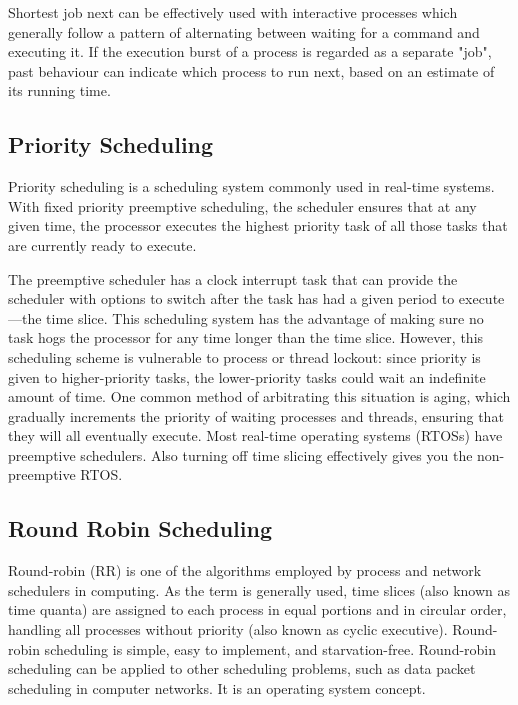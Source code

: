 \documentclass[11pt,a4paper]{report}
\begin{document}
Shortest job next can be effectively used with interactive processes which generally follow a pattern of alternating between waiting for a command and executing it. If the execution burst of a process is regarded as a separate "job", past behaviour can indicate which process to run next, based on an estimate of its running time.

\subsection*{Priority Scheduling}
\hspace*{\parindent}Priority scheduling is a scheduling system commonly used in real-time systems. With fixed priority preemptive scheduling, the scheduler ensures that at any given time, the processor executes the highest priority task of all those tasks that are currently ready to execute.

The preemptive scheduler has a clock interrupt task that can provide the scheduler with options to switch after the task has had a given period to execute—the time slice. This scheduling system has the advantage of making sure no task hogs the processor for any time longer than the time slice. However, this scheduling scheme is vulnerable to process or thread lockout: since priority is given to higher-priority tasks, the lower-priority tasks could wait an indefinite amount of time. One common method of arbitrating this situation is aging, which gradually increments the priority of waiting processes and threads, ensuring that they will all eventually execute. Most real-time operating systems (RTOSs) have preemptive schedulers. Also turning off time slicing effectively gives you the non-preemptive RTOS.

\subsection*{Round Robin Scheduling}
\hspace*{\parindent}Round-robin (RR) is one of the algorithms employed by process and network schedulers in computing. As the term is generally used, time slices (also known as time quanta) are assigned to each process in equal portions and in circular order, handling all processes without priority (also known as cyclic executive). Round-robin scheduling is simple, easy to implement, and starvation-free. Round-robin scheduling can be applied to other scheduling problems, such as data packet scheduling in computer networks. It is an operating system concept.
\end{document}
